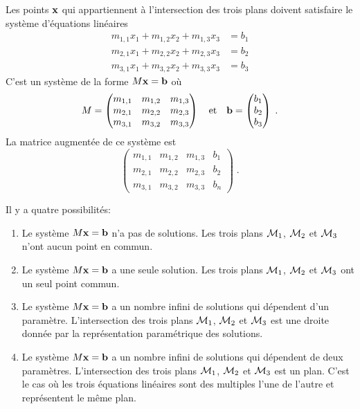 {Les points $\mathbf{x}$ qui appartiennent à l'intersection des trois
plans doivent satisfaire le système d'équations linéaires
\begin{align*}
m_{1,1} x_1 + m_{1,2} x_2 + m_{1,3} x_3 &= b_1 \\
m_{2,1} x_1 + m_{2,2} x_2 + m_{2,3} x_3 &= b_2 \\
m_{3,1} x_1 + m_{3,2} x_2 + m_{3,3} x_3 &= b_3
\end{align*}
C'est un système de la forme $M\mathbf{x} = \mathbf{b}$ où
\[
M= \begin{pmatrix}
m_{1,1} & m_{1,2} & m_{1,3} \\
m_{2,1} & m_{2,2} & m_{2,3} \\
m_{3,1} & m_{3,2} & m_{3,3}
\end{pmatrix}
\quad \text{et} \quad
\mathbf{b} =
\begin{pmatrix}
b_1 \\ b_2 \\ b_3  
\end{pmatrix} \; .
\]
La matrice augmentée de ce système est
\[
\left(\begin{array}{rrr|r}
m_{1,1} & m_{1,2} & m_{1,3} & b_1 \\
m_{2,1} & m_{2,2} & m_{2,3} & b_2 \\
m_{3,1} & m_{3,2} & m_{3,3} & b_n
\end{array}\right) \; .
\]

Il y a quatre possibilités:
\begin{enumerate}
\item Le système $M\mathbf{x} = \mathbf{b}$ n'a pas de solutions. Les trois
  plans ${\cal M}_1$, ${\cal M}_2$ et ${\cal M}_3$ n'ont aucun point
  en commun.
\item Le système $M\mathbf{x} = \mathbf{b}$ a une seule solution. Les trois
  plans ${\cal M}_1$, ${\cal M}_2$ et ${\cal M}_3$ ont un seul point
  commun.
\item Le système $M\mathbf{x} = \mathbf{b}$ a un nombre infini de solutions
  qui dépendent d'un paramètre.  L'intersection des trois plans
  ${\cal M}_1$, ${\cal M}_2$ et ${\cal M}_3$ est une droite donnée par
  la représentation paramétrique des solutions.
\item Le système $M\mathbf{x} = \mathbf{b}$ a un nombre infini de solutions
  qui dépendent de deux paramètres.  L'intersection des trois plans
  ${\cal M}_1$, ${\cal M}_2$ et ${\cal M}_3$ est un plan.  C'est le
  cas où les trois équations linéaires sont des multiples l'une de
  l'autre et représentent le même plan.
\end{enumerate}

}
